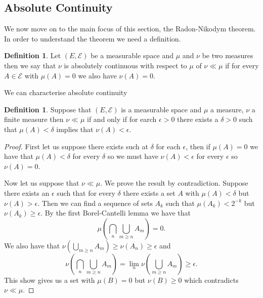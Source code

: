 \documentclass[11pt]{article}
\theoremstyle{definition}
\newtheorem{dfn}[thm]{Definition}
\theoremstyle{remark}
\begin{document}
\subsection{Absolute Continuity}
We now move on to the main focus of this section, the Radon-Nikodym theorem. In order to understand the theorem we need a definition.
\begin{dfn}
Let $(E, \mathcal{E})$ be a measurable space and $\mu$ and $\nu$ be two measures then we say that $\nu$ is absolutely continuous with respect to $\mu$ of $\nu \ll \mu$ if for every $A \in \mathcal{E}$ with $\mu(A) = 0$ we also have $\nu(A) = 0$.
\end{dfn}
We can characterise absolute continuity
\begin{dfn}
Suppose that $(E, \mathcal{E})$ is a measurable space and $\mu$ a measure, $\nu$ a finite measure then $\nu \ll \mu$ if and only if for earch $\epsilon >0$ there exists a $\delta>0$ such that $\mu(A) < \delta$ implies that $\nu(A) < \epsilon$. 
\end{dfn}
\begin{proof}
First let us suppose there exists such at $\delta$ for each $\epsilon$, then if $\mu(A) = 0$ we have that $\mu(A)< \delta$ for every $\delta$ so we must have $\nu(A) < \epsilon$ for every $\epsilon$ so $\nu(A) =0$.

Now let us suppose that $\nu \ll \mu$. We prove the result by contradiction. Suppose there exists an $\epsilon$ such that for every $\delta$ there exists a set $A$ with $\mu(A)< \delta$ but $\nu(A) >\epsilon$. Then we can find a sequence of sets $A_k$ such that $\mu(A_k) < 2^{-k}$ but $\nu(A_k) \geq \epsilon$. By the first Borel-Cantelli lemma we have that
\[ \mu \left( \bigcap_n \bigcup_{m \geq n} A_m \right) = 0. \] We also have that $\nu(\bigcup_{m \geq n} A_m) \geq \nu(A_n) \geq \epsilon$ and
\[\nu \left( \bigcap_n \bigcup_{m \geq n} A_m\right) = \lim_n \nu \left( \bigcup_{m \geq n} A_m \right) \geq \epsilon. \] This show gives us a set with $\mu(B) = 0$ but $\nu(B) \geq 0$ which contradicts $\nu \ll \mu$.
\end{proof}
\end{document}
